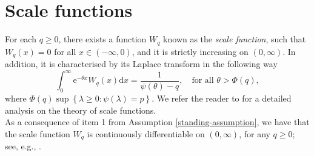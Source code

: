\documentclass[11pt,reqno]{amsart}
\newtheorem{remark}{Remark}[section]
\newcommand{\reals}{\mathbb{R}}
\newcommand{\diff}{\mathrm{d}}
\newcommand{\cH}{\mathcal{H}}
\renewcommand{\geq}{\geqslant}
\begin{document}
%
%
\section{Scale functions}\label{sect:scale}
For each $q \geq 0$, there exists a function $W_q$ known as the \textit{scale function}, such that $W_q(x) = 0$ for all $x\in (-\infty,0)$, and it is strictly increasing on $(0,\infty)$. In addition, it is characterised by its Laplace transform in the following way
\begin{equation}\label{scale:function:def}
	\int_0^\infty \mathrm{e}^{-\theta x} W_q (x) \mathrm{d}x = \frac{1}{\psi(\theta)-q} , \quad \text{for all $\theta> \Phi(q),$}
\end{equation}
where $\Phi(q)\sup \left\lbrace \lambda \geq 0 \colon \psi(\lambda)=p \right\rbrace$. We refer the reader to \cite{kuznetsov-et-al_2012} for a detailed analysis on the theory of scale functions.\\

As a consequence of item 1 from Assumption \ref{standing-assumption}, we have that the scale function $W_q$ is continuously differentiable on $(0,\infty)$, for any $q \geq 0$; see, e.g., \cite{kuznetsov-et-al_2012}.
\end{document}
